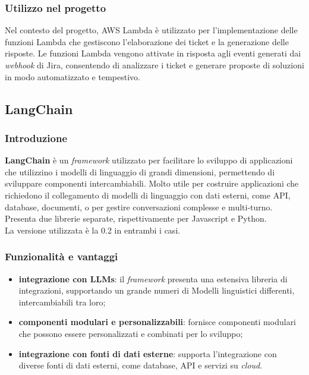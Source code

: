 \subsubsection{Utilizzo nel progetto}
 Nel contesto del progetto, AWS Lambda è utilizzato per l’implementazione delle funzioni Lambda che gestiscono l’elaborazione dei ticket e la generazione delle risposte. Le funzioni Lambda vengono attivate in risposta agli eventi generati dai \textit{webhook} di Jira, consentendo di analizzare i ticket e generare proposte di soluzioni in modo automatizzato e tempestivo.


\subsection{LangChain}

\subsubsection{Introduzione}
\textbf{LangChain} è un \textit{framework} utilizzato per facilitare lo sviluppo di applicazioni che utilizzino i modelli di linguaggio di grandi dimensioni, permettendo di sviluppare componenti intercambiabili. Molto utile per costruire applicazioni che richiedono il collegamento di modelli di linguaggio con dati esterni, come API, database, documenti, o per gestire conversazioni complesse e multi-turno. \\
Presenta due librerie separate, rispettivamente per Javascript e Python.\\
La versione utilizzata è la 0.2 in entrambi i casi.

\subsubsection{Funzionalità e vantaggi}
\begin{itemize}
    \item \textbf{integrazione con LLMs}: il \textit{framework} presenta una estensiva libreria di integrazioni, supportando un grande numeri di Modelli linguistici differenti, intercambiabili tra loro;
    \item \textbf{componenti modulari e personalizzabili}: fornisce componenti modulari che possono essere personalizzati e combinati per lo sviluppo;
    \item \textbf{integrazione con fonti di dati esterne}: supporta l’integrazione con diverse fonti di dati esterni, come database, API e servizi su \textit{cloud}.
\end{itemize}

